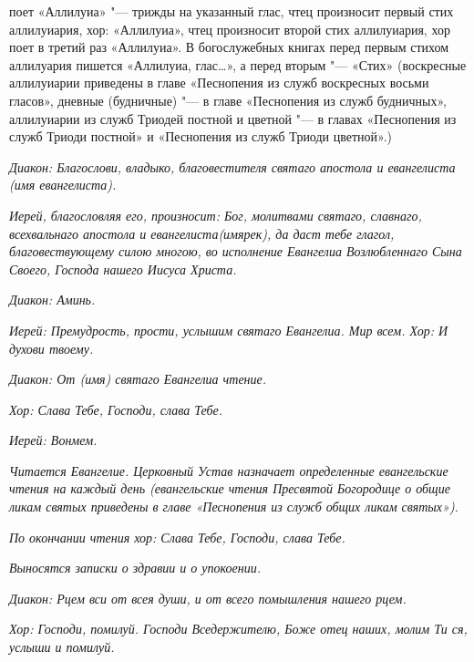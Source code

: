  поет «Аллилуиа» "--- трижды на указанный глас, чтец произносит первый стих аллилуиария, хор: «Аллилуиа», чтец произносит второй стих аллилуиария, хор поет в третий раз «Аллилуиа». В богослужебных книгах перед первым стихом аллилуария пишется «Аллилуиа, глас…», а перед вторым "--- «Стих» (воскресные аллилуиарии приведены в главе «Песнопения из служб воскресных восьми гласов», дневные (будничные) "--- в главе «Песнопения из служб будничных», аллилуиарии из служб Триодей постной и цветной "--- в главах «Песнопения из служб Триоди постной» и «Песнопения из служб Триоди цветной».)


\itshape Диакон:\normalfont{} Благослови, владыко, благовестителя святаго апостола и евангелиста \itshape (имя евангелиста)\normalfont{}.


\itshape Иерей, благословляя его, произносит:\normalfont{} Бог, молитвами святаго, славнаго, всехвальнаго апостола и евангелиста\itshape  (имярек)\normalfont{}, да даст тебе глагол, благовествующему силою многою, во исполнение Евангелиа Возлюбленнаго Сына Своего, Господа нашего Иисуса Христа.


\itshape Диакон:\normalfont{} Аминь.


\itshape Иерей:\normalfont{} Премудрость, прости, услышим святаго Евангелиа. Мир всем.
\itshape Хор:\normalfont{} И духови твоему.


\itshape Диакон:\normalfont{} От \itshape (имя\normalfont{}) святаго Евангелиа чтение.


\itshape Хор\normalfont{}: Слава Тебе, Господи, слава Тебе.


\itshape Иерей:\normalfont{} Вонмем.




\itshape Читается Евангелие. Церковный Устав назначает определенные евангельские чтения на каждый день (евангельские чтения Пресвятой Богородице о общие ликам святых приведены в главе «Песнопения из служб общих ликам святых»).\normalfont{}


\itshape По окончании чтения хор:\normalfont{} Слава Тебе, Господи, слава Тебе.


\itshape Выносятся записки о здравии и о упокоении.\normalfont{}




\itshape Диакон:\normalfont{} Рцем вси от всея души, и от всего помышления нашего рцем.


\itshape  Хор:\normalfont{} Господи, помилуй. Господи Вседержителю, Боже отец наших, молим Ти ся, услыши и помилуй.


